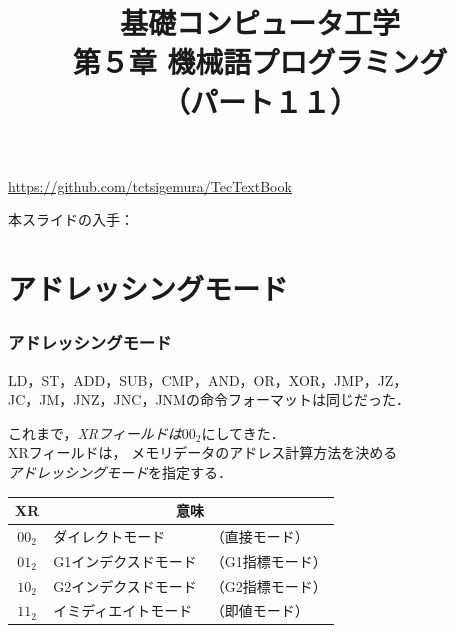 \documentclass{beamer}                 %
\begin{document}
\title{基礎コンピュータ工学\\第５章 機械語プログラミング\\（パート１１）}
\date{}

\begin{frame}
  \titlepage
  \centerline{\url{https://github.com/tctsigemura/TecTextBook}}
  \vfill
  \centerline{本スライドの入手：
    }
\end{frame}


\section{アドレッシングモード}
\begin{frame}
  \frametitle{アドレッシングモード}
  LD，ST，ADD，SUB，CMP，AND，OR，XOR，JMP，JZ，\\
  JC，JM，JNZ，JNC，JNMの命令フォーマットは同じだった．
  \twoByte{\OP}{\GR~\XR}{\A}

  これまで，\emph{XRフィールドは$00_2$}にしてきた．\\
  XRフィールドは，
  メモリデータのアドレス計算方法を決める\\
  \emph{アドレッシングモード}を指定する．\\

  {\small\begin{center}
    \begin{tabular}{c|l l}
      \hline
      \hline
      XR & \multicolumn{2}{|c}{意味} \\
      \hline
      $00_2$ & ダイレクトモード     & （直接モード）   \\
      $01_2$ & G1インデクスドモード & （G1指標モード） \\
      $10_2$ & G2インデクスドモード & （G2指標モード） \\
      $11_2$ & イミディエイトモード & （即値モード）   \\
    \end{tabular}
  \end{center}}
  \vfill
  \vfill
\end{frame}
\end{document}
